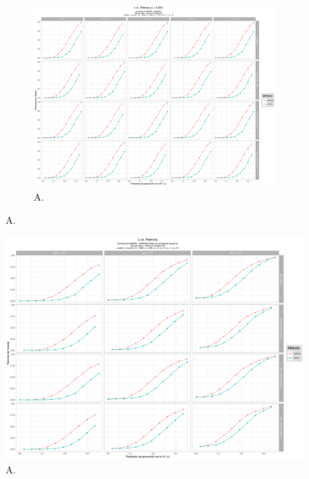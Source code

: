 \documentclass[IB,BIB]{TFUOC}%
\begin{document}
\begin{figure}[!htbp]
\begin{subfigure}{.65\textwidth}
\hspace*{3.5cm} %
  \centering
  \includegraphics[width=.9\linewidth]{OBJ1c30001.pdf}
  \caption{\scriptsize{A.}}
  \label{figAppend:OBJ1c30001}
\end{subfigure}
\caption{\scriptsize{A.}}
\label{figAppend:OBJ1c}
\end{figure}

\begin{figure}[!htbp]
\hspace*{-1.6cm} %
    \centering
    \includegraphics[scale=.51]{OBJ1dallalpha.pdf}
    \caption{\scriptsize{A.}}
    \label{figAppend:OBJ1dallalpha}
\end{figure}
\end{document}
